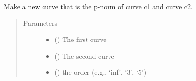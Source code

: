 \documentclass[letterpaper,10pt,english]{sphinxmanual}
\begin{document}

\begin{fulllineitems}
\label{\detokenize{pydv:pydvpy.norm}}
Make a new curve that is the p-norm of curve c1 and curve c2.

\begin{sphinxVerbatim}[commandchars=\\\{\}]
  
\end{sphinxVerbatim}

\begin{sphinxVerbatim}[commandchars=\\\{\}]
  \PYG{p}{[}\PYG{p}{]} \PYG{p}{[}\PYG{p}{]} 
\end{sphinxVerbatim}

\begin{sphinxVerbatim}[commandchars=\\\{\}]
\end{sphinxVerbatim}
\begin{quote}\begin{description}
\item[{Parameters}] \leavevmode\begin{itemize}
\item {} 
 ({\hyperref[\detokenize{pydv:curve.Curve}]{}}) \textendash{} The first curve

\item {} 
 ({\hyperref[\detokenize{pydv:curve.Curve}]{}}) \textendash{} The second curve

\item {} 
 () \textendash{} the order (e.g., ‘inf’, ‘3’, ‘5’)


\end{itemize}
\end{description}
\end{quote}
\end{fulllineitems}
\end{document}
